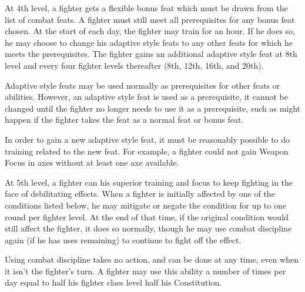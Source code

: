  At 4th level, a fighter gets a flexible bonus feat
which must be drawn from the list of combat feats. A fighter must still
meet all prerequisites for any bonus feat chosen. At the start of each day, the fighter may train for an hour. If he does so, he may choose to change his adaptive style feats to any other feats for which he meets the prerequisites.
The fighter gains an additional adaptive style feat at 8th level and every four fighter levels thereafter (8th, 12th, 16th, and 20th).
\par Adaptive style feats may be used normally as prerequisites for other feats or abilities.
However, an adaptive style feat is used as a prerequisite, it cannot be changed until the
fighter no longer needs to use it as a prerequisite, such as might happen if the fighter takes
the feat as a normal feat or bonus feat.
\par In order to gain a new adaptive style feat, it must be reasonably possible to do training related to the new feat. For example, a fighter could not gain Weapon Focus in axes without at least one axe available.

 At 5th level, a fighter can his superior training and focus to keep fighting in the face of debilitating effects. When a fighter is initially affected by one of the conditions listed below, he may mitigate or negate the condition for up to one round per fighter level. At the end of that time, if the original condition would still affect the fighter, it does so normally, though he may use combat discipline again (if he has uses remaining) to continue to fight off the effect.
\par Using combat discipline takes no action, and can be done at any time, even when it isn't the fighter's turn. A fighter may use this ability a number of times per day equal to half his fighter class level \add half his Constitution.

